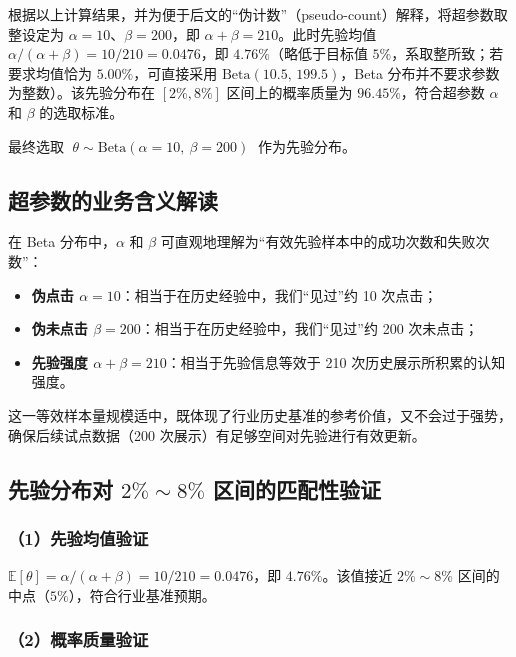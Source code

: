 \documentclass[12pt,a4paper,UTF8,fontset=none]{ctexart}
\newcommand{\tht}{\theta}
\begin{document}
根据以上计算结果，并为便于后文的“伪计数”（pseudo-count）解释，将超参数取整设定为 $\alpha=10$、$\beta=200$，即 $\alpha+\beta=210$。此时先验均值 $\alpha/(\alpha+\beta)=10/210=0.0476$，即 $4.76\%$（略低于目标值 $5\%$，系取整所致；若要求均值恰为 $5.00\%$，可直接采用 $\mathrm{Beta}(10.5,\,199.5)$，Beta 分布并不要求参数为整数）。该先验分布在 $[2\%,8\%]$ 区间上的概率质量为 $96.45\%$，符合超参数 $\alpha$ 和 $\beta$ 的选取标准。

\begin{keybox}
\centering
最终选取 $\;\tht\sim\mathrm{Beta}(\alpha=10,\ \beta=200)\;$ 作为先验分布。
\end{keybox}

\subsection{超参数的业务含义解读}

在 Beta 分布中，$\alpha$ 和 $\beta$ 可直观地理解为“有效先验样本中的成功次数和失败次数”：

\begin{itemize}
  \item \textbf{伪点击 $\alpha=10$}：相当于在历史经验中，我们“见过”约 10 次点击；
  \item \textbf{伪未点击 $\beta=200$}：相当于在历史经验中，我们“见过”约 200 次未点击；
  \item \textbf{先验强度 $\alpha+\beta=210$}：相当于先验信息等效于 210 次历史展示所积累的认知强度。
\end{itemize}

这一等效样本量规模适中，既体现了行业历史基准的参考价值，又不会过于强势，确保后续试点数据（200 次展示）有足够空间对先验进行有效更新。

\subsection{先验分布对 $2\%\sim8\%$ 区间的匹配性验证}

\subsubsection{（1）先验均值验证}

$\mathbb{E}[\tht]=\alpha/(\alpha+\beta)=10/210=0.0476$，即 $4.76\%$。该值接近 $2\%\sim8\%$ 区间的中点（$5\%$），符合行业基准预期。

\subsubsection{（2）概率质量验证}
\end{document}
